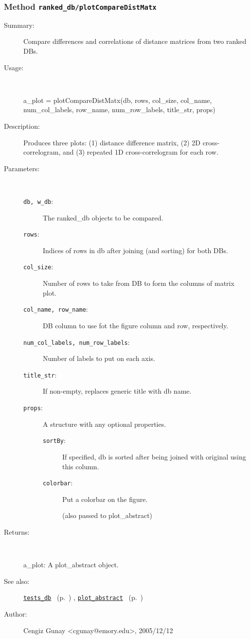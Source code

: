 \subsubsection[Method \texttt{plotCompareDistMatx}]{Method \texttt{ranked\_db/plotCompareDistMatx}}%
%
\label{ref_ranked_db__plotCompareDistMatx}%
\hypertarget{ref_ranked_db__plotCompareDistMatx}{}%
\begin{description}
\item[Summary:]Compare differences and correlations of distance matrices from two ranked DBs.
%
\item[Usage:]~%
\begin{lyxcode}%
a\_plot = plotCompareDistMatx(db, rows, col\_size, col\_name, num\_col\_labels, 
			  row\_name, num\_row\_labels, title\_str, props)
%
\end{lyxcode}%
%
\item[Description:]%
Produces three plots: (1) distance difference matrix, (2) 2D cross-correlogram, 
 and (3) repeated 1D cross-correlogram for each row.
\item[Parameters:]~
\begin{description}%
\item[\texttt{db, w\_db}:]
 The ranked\_db objects to be compared.
\item[\texttt{rows}:]
 Indices of rows in db after joining (and sorting) for both DBs.
\item[\texttt{col\_size}:]
 Number of rows to take from DB to form the columns of matrix plot.
\item[\texttt{col\_name, row\_name}:]
 DB column to use fot the figure column and row, respectively.
\item[\texttt{num\_col\_labels, num\_row\_labels}:]
 Number of labels to put on each axis.
\item[\texttt{title\_str}:]
 If non-empty, replaces generic title with db name. 
\item[\texttt{props}:]
 A structure with any optional properties.
\begin{description}%
\item[\texttt{sortBy}:]
 If specified, db is sorted after being joined with original using this column.
\item[\texttt{colorbar}:]
 Put a colorbar on the figure.

(also passed to plot\_abstract)
\end{description}%
\end{description}%
%
\item[Returns:
]~

	a\_plot: A plot\_abstract object.
%
%
\item[See also:]%
\hyperlink{ref_tests_db}{\texttt{tests\_db}}%
\ (p.~\pageref{ref_tests_db})%
%
, \hyperlink{ref_plot_abstract}{\texttt{plot\_abstract}}%
\ (p.~\pageref{ref_plot_abstract})%
%
%
\item[Author:]%
Cengiz Gunay <cgunay@emory.edu>, 2005/12/12
%
\end{description}
\methodline%
